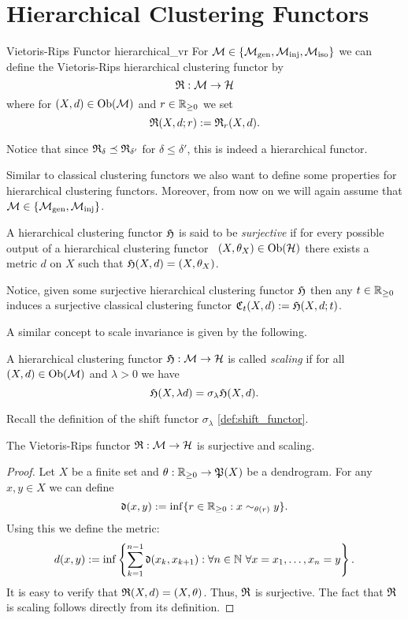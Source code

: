 \chapter{Hierarchical Clustering Functors}
\label{chapter__hierarchical}

\begin{definition}{Vietoris-Rips Functor \cite[Ex.~7.1]{Carlsson2010}}{hierarchical_vr}
For $\mathcal{M} \in \{{\mathcal{M}_\mathrm{gen}},{\mathcal{M}_\mathrm{inj}},{\mathcal{M}_\mathrm{iso}}\}$ we can define the Vietoris-Rips hierarchical clustering functor by
$$
\mathfrak{R}: \mathcal{M} \to \mathcal{H}
$$
where for $(X,d) \in \mathrm {Ob}(\mathcal{M})$ and $r \in \mathbb R_{\geq0}$ we set
$$
\mathfrak{R}(X,d; r) := \mathfrak{R}_r(X,d).
$$
\end{definition}
Notice that since $\mathfrak{R}_\delta \preceq \mathfrak{R}_{\delta'}$ for $\delta \leq \delta'$, this is indeed a hierarchical functor.

Similar to classical clustering functors we also want to define some properties for hierarchical clustering functors. Moreover, from now on we will again assume that $\mathcal{M} \in \{{\mathcal{M}_\mathrm{gen}}, {\mathcal{M}_\mathrm{inj}}\}$.

\begin{definition}{}{}
    A hierarchical clustering functor $\mathfrak{H}$ is said to be \emph{surjective} if for every possible output of a hierarchical clustering functor \ie\ $(X, \theta_X) \in \mathrm {Ob}(\mathcal{H})$ there exists a metric $d$ on $X$ such that $\mathfrak{H}(X,d) = (X, \theta_X)$.
\end{definition}

Notice, given some surjective hierarchical clustering functor $\mathfrak{H}$ then any $t \in \mathbb R_{\geq0}$ induces a surjective classical clustering functor $\mathfrak{C}_t(X,d) := \mathfrak{H}(X, d; t)$.

A similar concept to scale invariance is given by the following.

\begin{definition}{}{}
A hierarchical clustering functor $\mathfrak{H}: \mathcal{M} \to \mathcal{H}$ is called \emph{scaling} if for all $(X,d) \in \mathrm {Ob}(\mathcal{M})$ and $\lambda > 0$ we have
$$
\mathfrak{H}(X, \lambda d) = \sigma_\lambda \mathfrak{H}(X,d).
$$
\end{definition}
Recall the definition of the shift functor $\sigma_\lambda$ \ref{def:shift_functor}.

\begin{proposition}{\cite[Sec.~7.3.1]{Carlsson2010}}{}
The Vietoris-Rips functor $\mathfrak{R}: \mathcal{M} \to \mathcal{H}$ is surjective and scaling.
\end{proposition}

\begin{proof}
Let $X$ be a finite set and $\theta: \mathbb R_{\geq0} \to \mathfrak{P}(X)$ be a dendrogram. For any $x,y \in X$ we can define
$$
\mathfrak{d}(x,y) := \inf\{r \in \mathbb R_{\geq0}: x \sim_{\theta(r)} y\}.
$$
Using this we define the metric:
$$
d(x,y) := \inf\left\{\sum_{k=1}^{n-1} \mathfrak{d}(x_k, x_{k+1}): \forall n \in \mathbb N \ \forall x = x_1, \dots, x_n = y\right\}.
$$
It is easy to verify that $\mathfrak{R}(X,d) = (X,\theta)$. Thus, $\mathfrak{R}$ is surjective. The fact that $\mathfrak{R}$ is scaling follows directly from its definition.
\end{proof}



